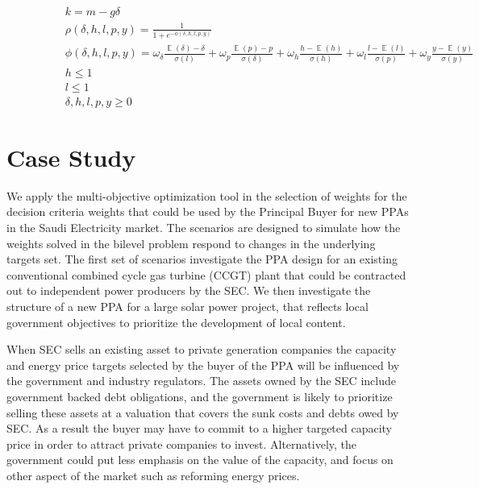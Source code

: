 \documentclass[informs]{informs3}
\begin{document}
\begin{subequations}
\begin{align}
	&\qquad \qquad k = m -g \delta \label{eqBuyerCapacityDemand}\\
	&\qquad	\qquad \rho(\delta, h, l, p,y)=\frac{1}{1+e^{-\phi(\delta, h, l, p, y)}} \label{eqGeneratorProbability}\\
	&\qquad	\qquad \phi(\delta, h, l, p, y) =  	 \omega_{\delta}\frac{\mathop{\mathbb{E}}\left(\delta\right)-\delta }
{\sigma\left(l\right)}+\omega_{p}\frac{\mathop{\mathbb{E}}\left(p\right)-p}  {\sigma\left(\delta\right)} 
	+\omega_{h}\frac{ h-\mathop{\mathbb{E}}\left(h\right)}
{\sigma\left(h\right)}+\omega_{l}\frac{ l-\mathop{\mathbb{E}}\left(l\right) }{\sigma\left(p\right)}+\omega_{y}\frac{y-\mathop{\mathbb{E}}\left(y\right)}{\sigma\left(y\right)} \label{eqGeneratorRating}\\
	&\qquad \qquad  h \leq 1 \label{eqGeneratorFinance}\\
	&\qquad \qquad  l \leq 1 \label{eqGeneratorLocal}\\
	&\qquad \qquad  \delta, h, l, p, y \geq 0 \label{eqGeneratorNon-Negative}
	\end{align}
\end{subequations}




\section{Case Study}\label{Section_CaseStudy}

We apply the multi-objective optimization tool in the selection of weights for the decision criteria weights that could be used by the Principal Buyer for new PPAs in the Saudi Electricity market. The scenarios are designed to simulate how the weights solved in the bilevel problem respond to changes in the underlying targets set.  The first set of scenarios investigate the PPA design for an existing conventional combined cycle gas turbine (CCGT) plant that could be contracted out to independent power producers by the SEC. We then investigate the structure of a new PPA for a large solar power project, that reflects local government objectives to prioritize the development of local content. 

When SEC sells an existing asset to private generation companies the  capacity and energy price targets selected by the buyer of the PPA will be influenced by the government and industry regulators. The assets owned by the SEC include government backed debt obligations, and the government is likely to prioritize selling these assets at a valuation that covers the sunk costs and debts owed by SEC. As a result the buyer may have to commit to a higher targeted capacity price in order to attract private companies to invest. Alternatively, the government could put less emphasis on the value of the capacity, and focus on other aspect of the market such as reforming energy prices.
 
\end{document}
